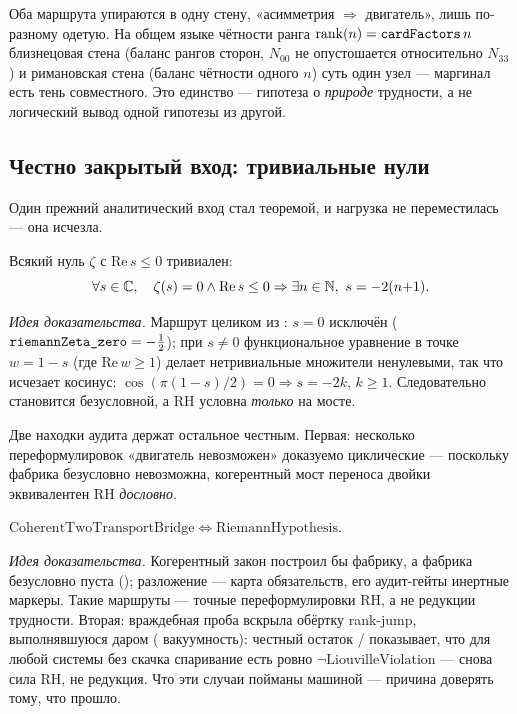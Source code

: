 Оба маршрута упираются в одну стену, «асимметрия $\Rightarrow$ двигатель», лишь по-разному одетую. На
общем языке чётности ранга $\mathrm{rank}(n) = \texttt{cardFactors}\,n$ близнецовая стена (баланс рангов
сторон, $N_{00}$ не опустошается относительно $N_{33}$) и римановская стена (баланс чётности одного
$n$) суть один узел --- маргинал есть тень совместного. Это единство --- гипотеза о \emph{природе}
трудности, а не логический вывод одной гипотезы из другой.

\subsection{Честно закрытый вход: тривиальные нули}

Один прежний аналитический вход стал теоремой, и нагрузка не переместилась --- она исчезла.

\begin{theorem}\label{thm:trivialBelowZeroClassification}
Всякий нуль $\zeta$ с $\mathrm{Re}\,s\le0$ тривиален:
\begin{equation}\label{eq:trivial-zeros}
  \forall s\in\mathbb{C},\quad \zeta(s)=0 \wedge \mathrm{Re}\,s\le0 \Rightarrow \exists n\in\mathbb{N},\ s = -2(n{+}1) .
\end{equation}
\green{}
\end{theorem}

\emph{Идея доказательства.} Маршрут целиком из : $s=0$ исключён
($\texttt{riemannZeta\_zero}=-\tfrac12$); при $s\ne0$ функциональное уравнение
 в точке $w=1-s$ (где $\mathrm{Re}\,w\ge1$) делает нетривиальные
множители ненулевыми, так что исчезает косинус: $\cos(\pi(1-s)/2)=0 \Rightarrow s=-2k$, $k\ge1$.
Следовательно  становится безусловной, а RH условна \emph{только} на
мосте.

Две находки аудита держат остальное честным. Первая: несколько переформулировок «двигатель
невозможен» доказуемо циклические --- поскольку фабрика безусловно невозможна, когерентный мост
переноса двойки эквивалентен RH \emph{дословно}.

\begin{theorem}\label{thm:coherentTwoTransportBridge_iff_RH}
$\mathrm{CoherentTwoTransportBridge} \iff \mathrm{RiemannHypothesis}$. \green{}
\end{theorem}

\emph{Идея доказательства.} Когерентный закон построил бы фабрику, а фабрика безусловно пуста
(); разложение --- карта обязательств, его аудит-гейты инертные
маркеры. Такие маршруты --- точные переформулировки RH, а не редукции трудности. Вторая: враждебная
проба вскрыла обёртку rank-jump, выполнявшуюся даром (\warn{} вакуумность): честный остаток
/ показывает, что для любой системы без скачка спаривание есть
ровно $\neg\mathrm{LiouvilleViolation}$ --- снова сила RH, не редукция. Что эти случаи пойманы
машиной --- причина доверять тому, что прошло.

